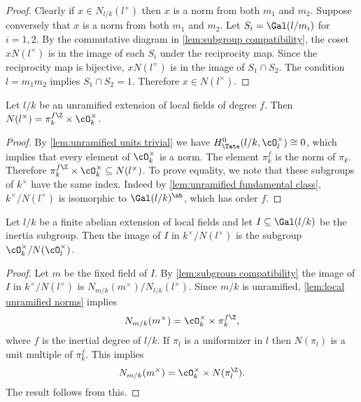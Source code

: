 \begin{proof}
	Clearly if $x \in N_{l/k}(l^\times)$ then $x$ is a norm from both $m_1$ and $m_2$.
	Suppose conversely that $x$ is a norm from both $m_1$ and $m_2$.
	Let $S_i=\Gal(l/m_i)$ for $i=1,2$.
	By the commutative diagram in \ref{lem:subgroup compatibility},
	the coset $xN(l^\times)$ is in the image of each $S_i$ under the reciprocity map.
	Since the reciprocity map is bijective, $xN(l^\times)$ is in the image of
	$S_1 \cap S_2$.
	The condition $l = m_1 m_2$ implies $S_1 \cap S_2 = 1$.
	Therefore $x \in N(l^\times)$.
\end{proof}



\begin{lemma} \label{lem:local unramified norms}
	Let $l/k$ be an unramified extension of local fields of degree $f$.
	Then $N(l^\times) = \pi_k^{f\Z} \times \cO_k^\times$.
\end{lemma}

\begin{proof}
	By \ref{lem:unramified units trivial} we have $H^0_{\Tate}(l/k,\cO_l^\times) \cong 0$,
	which implies that every element of $\cO_k^\times$ is a norm.
	The element $\pi_k^f$ is the norm of $\pi_k$.
	Therefore $\pi_k^{f\Z} \times \cO_k^\times \subseteq N(l^\times)$.
	To prove equality, we note that these subgroups of $k^\times$ have the same index.
	Indeed by \ref{lem:unramified fundamental class}, $k^\times / N(l^\times)$
	is isomorphic to $\Gal(l/k)^\ab$, which has order $f$.
\end{proof}


\begin{lemma} \label{lem:local image inertia}
	Let $l/k$ be a finite abelian extension of local fields and let $I \subseteq \Gal(l/k)$ be
	the inertia subgroup.
	Then the image of $I$ in $k^\times / N(l^\times)$
	is the subgroup $\cO_k^\times / N(\cO_l^\times)$.
\end{lemma}

\begin{proof}
	Let $m$ be the fixed field of $I$.
	By \ref{lem:subgroup compatibility} the image of $I$ in $k^\times / N(l^\times)$
	is $N_{m/k}(m^\times) / N_{l/k}(l^\times)$.
	Since $m/k$ is unramified, \ref{lem:local unramified norms} implies
	\[
		N_{m/k}(m^\times) = \cO_k^\times \times \pi_k^{f\Z},
	\]
	where $f$ is the inertial degree of $l/k$.
	If $\pi_l$ is a uniformizer in $l$ then $N(\pi_l)$ is a unit multiple of $\pi_k^f$.
	This implies
	\[
		N_{m/k}(m^\times) = \cO_k^\times \times N(\pi_l^{\Z}).
	\]
	The result follows from this.
\end{proof}

